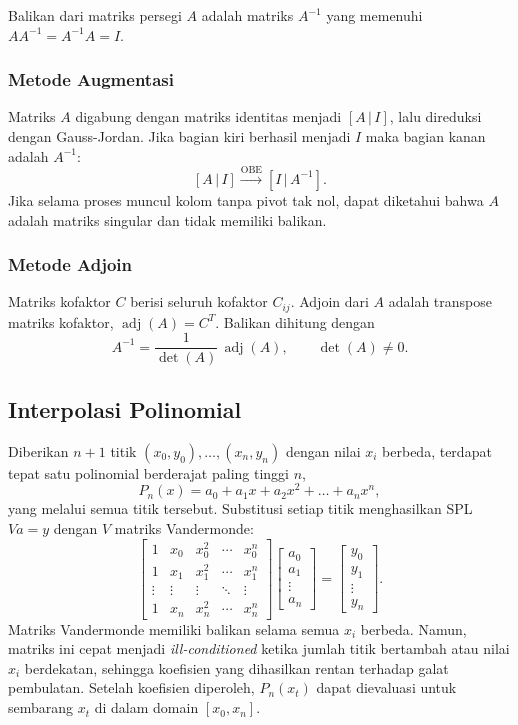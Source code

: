 Balikan dari matriks persegi $A$ adalah matriks $A^{-1}$ yang memenuhi $AA^{-1} = A^{-1}A = I$.

\subsubsection{Metode Augmentasi}

Matriks $A$ digabung dengan matriks identitas menjadi $[A\,|\,I]$, lalu direduksi dengan Gauss-Jordan. Jika bagian kiri berhasil menjadi $I$ maka bagian kanan adalah $A^{-1}$:
\[
[A\,|\,I] \xrightarrow{\text{OBE}} [I\,|\,A^{-1}] .
\]
Jika selama proses muncul kolom tanpa pivot tak nol, dapat diketahui bahwa $A$ adalah matriks singular dan tidak memiliki balikan.

\subsubsection{Metode Adjoin}

Matriks kofaktor $C$ berisi seluruh kofaktor $C_{ij}$. Adjoin dari $A$ adalah transpose matriks kofaktor, $\operatorname{adj}(A) = C^T$. Balikan dihitung dengan
\[
A^{-1} = \frac{1}{\det(A)}\, \operatorname{adj}(A), \qquad \det(A) \neq 0 .
\]

\subsection{Interpolasi Polinomial}

Diberikan $n+1$ titik $(x_0, y_0), \dots, (x_n, y_n)$ dengan nilai $x_i$ berbeda, terdapat tepat satu polinomial berderajat paling tinggi $n$,
\[
P_n(x) = a_0 + a_1 x + a_2 x^2 + \dots + a_n x^n ,
\]
yang melalui semua titik tersebut. Substitusi setiap titik menghasilkan SPL $Va = y$ dengan $V$ matriks Vandermonde:
\[
\begin{bmatrix}
1 & x_0 & x_0^2 & \cdots & x_0^n \\
1 & x_1 & x_1^2 & \cdots & x_1^n \\
\vdots & \vdots & \vdots & \ddots & \vdots \\
1 & x_n & x_n^2 & \cdots & x_n^n
\end{bmatrix}
\begin{bmatrix} a_0 \\ a_1 \\ \vdots \\ a_n \end{bmatrix}
=
\begin{bmatrix} y_0 \\ y_1 \\ \vdots \\ y_n \end{bmatrix}.
\]
Matriks Vandermonde memiliki balikan selama semua $x_i$ berbeda. Namun, matriks ini cepat menjadi \textit{ill-conditioned} ketika jumlah titik bertambah atau nilai $x_i$ berdekatan, sehingga koefisien yang dihasilkan rentan terhadap galat pembulatan. Setelah koefisien diperoleh, $P_n(x_t)$ dapat dievaluasi untuk sembarang $x_t$ di dalam domain $[x_0, x_n]$.

